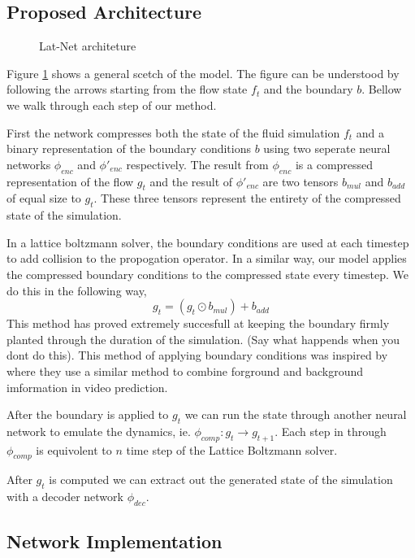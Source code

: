 \documentclass{article}
\begin{document}
\subsection{Proposed Architecture}

\begin{figure}[!t]
\centering
{}
\caption{Lat-Net architeture }
\label{fig_1}
\end{figure}

Figure \ref{fig_1} shows a general scetch of the model. The figure can be understood by following the arrows starting from the flow state $f_t$ and the boundary $b$. Bellow we walk through each step of our method.

First the network compresses both the state of the fluid simulation $f_t$ and a binary representation of the boundary conditions $b$ using two seperate neural networks $\phi_{enc}$ and $\phi'_{enc}$ respectively. The result from $\phi_{enc}$ is a compressed representation of the flow $g_t$ and the result of $\phi'_{enc}$ are two tensors $b_{mul}$ and $b_{add}$ of equal size to $g_t$. These three tensors represent the entirety of the compressed state of the simulation.

In a lattice boltzmann solver, the boundary conditions are used at each timestep to add collision to the propogation operator. In a similar way, our model applies the compressed boundary conditions to the compressed state every timestep. We do this in the following way,
\begin{equation}
  g_t = (g_t \odot b_{mul}) + b_{add}
\end{equation}
This method has proved extremely succesfull at keeping the boundary firmly planted through the duration of the simulation. (Say what happends when you dont do this). This method of applying boundary conditions was inspired by\cite{vondrick2016generating} where they use a similar method to combine forground and background imformation in video prediction.

After the boundary is applied to $g_t$ we can run the state through another neural network to emulate the dynamics, ie. $\phi_{comp}:g_{t} \rightarrow g_{t+1}$. Each step in through $\phi_{comp}$ is equivolent to $n$ time step of the Lattice Boltzmann solver.

After $g_t$ is computed we can extract out the generated state of the simulation with a decoder network $\phi_{dec}$. 


\subsection{Network Implementation}
\end{document}
